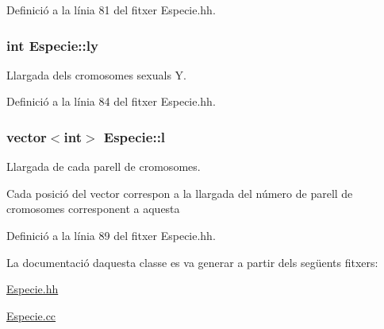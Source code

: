 Definició a la línia 81 del fitxer Especie.\+hh.

\subsubsection[{\texorpdfstring{ly}{ly}}]{\setlength{\rightskip}{0pt plus 5cm}int Especie\+::ly\hspace{0.3cm}{\ttfamily [private]}}\hypertarget{class_especie_a5d8a4e5dced433508eb01bd748c6b562}{}\label{class_especie_a5d8a4e5dced433508eb01bd748c6b562}


Llargada dels cromosomes sexuals Y. 



Definició a la línia 84 del fitxer Especie.\+hh.

\subsubsection[{\texorpdfstring{l}{l}}]{\setlength{\rightskip}{0pt plus 5cm}vector$<$int$>$ Especie\+::l\hspace{0.3cm}{\ttfamily [private]}}\hypertarget{class_especie_ae32ed22b56d80f11c181911c67fa0e95}{}\label{class_especie_ae32ed22b56d80f11c181911c67fa0e95}


Llargada de cada parell de cromosomes. 

Cada posició del vector correspon a la llargada del número de parell de cromosomes corresponent a aquesta 

Definició a la línia 89 del fitxer Especie.\+hh.



La documentació d\textquotesingle{}aquesta classe es va generar a partir dels següents fitxers\+:\begin{DoxyCompactItemize}
\item 
\hyperlink{_especie_8hh}{Especie.\+hh}\item 
\hyperlink{_especie_8cc}{Especie.\+cc}\end{DoxyCompactItemize}
